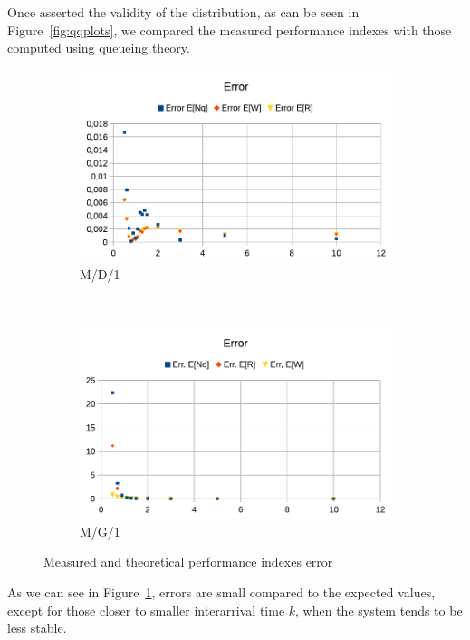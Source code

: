 \documentclass[a4paper,12pt]{article}
\begin{document}
Once asserted the validity of the distribution, as can be seen in Figure~\ref{fig:qqplots}, we compared the measured performance indexes with those computed using queueing theory.

\begin{figure}[H]
  \centering
  \begin{subfigure}[b]{0.45\textwidth}
    \includegraphics[width=\textwidth]{img/MD1-error.pdf}
    \caption{M/D/1}
  \end{subfigure}
  ~
  \begin{subfigure}[b]{0.45\textwidth}
    \includegraphics[width=\textwidth]{img/MG1-error.pdf}
    \caption{M/G/1}
  \end{subfigure}
  \caption{Measured and theoretical performance indexes error}
  \label{fig:perf-index-error}
\end{figure}

As we can see in Figure~\ref{fig:perf-index-error}, errors are small compared to the expected values, except for those closer to smaller interarrival time $k$, when the system tends to be less stable.
\end{document}
